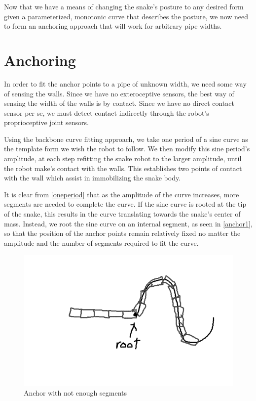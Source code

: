 Now that we have a means of changing the snake's posture to any desired form given a parameterized, monotonic curve that describes the posture, we now need to form an anchoring approach that will work for arbitrary pipe widths.

\section{Anchoring}
\label{anchoring}

In order to fit the anchor points to a pipe of unknown width, we need some way of sensing the walls. Since we have no exteroceptive sensors, the best way of sensing the width of the walls is by contact. Since we have no direct contact sensor per se, we must detect contact indirectly through the robot's proprioceptive joint sensors.

Using the backbone curve fitting approach, we take one period of a sine curve as the template form we wish the robot to follow. We then modify this sine period's amplitude, at each step refitting the snake robot to the larger amplitude, until the robot make's contact with the walls. This establishes two points of contact with the wall which assist in immobilizing the snake body.

It is clear from \autoref{oneperiod} that as the amplitude of the curve increases, more segments are needed to complete the curve. If the sine curve is rooted at the tip of the snake, this results in the curve translating towards the snake's center of mass. Instead, we root the sine curve on an internal segment, as seen in \autoref{anchor1}, so that the position of the anchor points remain relatively fixed no matter the amplitude and the number of segments required to fit the curve.

\begin{figure}[htbp]
\centering
\includegraphics[keepaspectratio,width=400pt,height=0.75\textheight]{2_anchoring_1.png}
\caption{Anchor with not enough segments}
\label{anchor1}
\end{figure}



